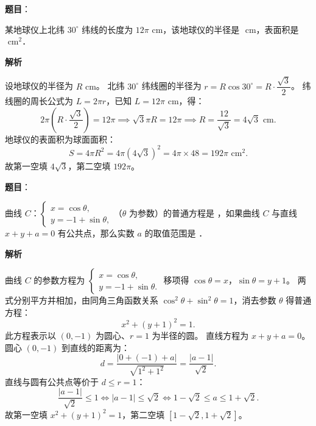 \begin{answer}

\textbf{题目}：

某地球仪上北纬 $30^\circ$ 纬线的长度为 $12\pi\text{ cm}$，该地球仪的半径是 \underline{\hspace{3em}}$\text{ cm}$，表面积是 \underline{\hspace{3em}}$\text{ cm}^2$．

\textbf{解析}

设地球仪的半径为 $R\text{ cm}$。
北纬 $30^\circ$ 纬线圈的半径为 $r=R\cos 30^\circ=R\cdot\dfrac{\sqrt{3}}{2}$。
纬线圈的周长公式为 $L=2\pi r$，已知 $L=12\pi\text{ cm}$，得：
\nopagebreak[4]
\[
2\pi\left(R\cdot\frac{\sqrt{3}}{2}\right)=12\pi\implies \sqrt{3}\pi R=12\pi\implies R=\frac{12}{\sqrt{3}}=4\sqrt{3}\text{ cm}.
\]
地球仪的表面积为球面面积：
\nopagebreak[4]
\[
S=4\pi R^2=4\pi(4\sqrt{3})^2=4\pi\times 48=192\pi\text{ cm}^2.
\]
故第一空填 $4\sqrt{3}$，第二空填 $192\pi$。


\end{answer}
\begin{answer}

\textbf{题目}：

曲线 $C$：$\begin{cases} x=\cos\theta, \\ y=-1+\sin\theta, \end{cases}$（$\theta$ 为参数）的普通方程是 \underline{\hspace{3em}}，如果曲线 $C$ 与直线 $x+y+a=0$ 有公共点，那么实数 $a$ 的取值范围是 \underline{\hspace{3em}}．

\textbf{解析}

曲线 $C$ 的参数方程为 $\begin{cases} x=\cos\theta, \\ y=-1+\sin\theta. \end{cases}$
移项得 $\cos\theta=x$，$\sin\theta=y+1$。
两式分别平方并相加，由同角三角函数关系 $\cos^2\theta+\sin^2\theta=1$，消去参数 $\theta$ 得普通方程：
\nopagebreak[4]
\[
x^2+(y+1)^2=1.
\]
此方程表示以 $(0, -1)$ 为圆心、$r=1$ 为半径的圆。
直线方程为 $x+y+a=0$。
圆心 $(0, -1)$ 到直线的距离为：
\nopagebreak[4]
\[
d=\frac{|0+(-1)+a|}{\sqrt{1^2+1^2}}=\frac{|a-1|}{\sqrt{2}}.
\]
直线与圆有公共点等价于 $d\le r=1$：
\nopagebreak[4]
\[
\frac{|a-1|}{\sqrt{2}}\le 1\iff |a-1|\le\sqrt{2}\iff 1-\sqrt{2}\le a\le 1+\sqrt{2}.
\]
故第一空填 $x^2+(y+1)^2=1$，第二空填 $[1-\sqrt{2}, 1+\sqrt{2}]$。


\end{answer}

